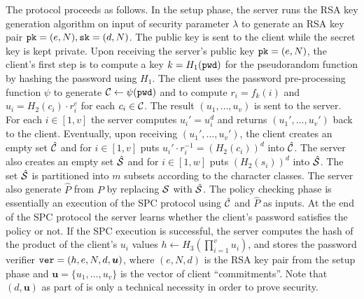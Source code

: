 The protocol proceeds as follows. 
In the setup phase, the server runs the RSA key generation algorithm on input of security parameter $\lambda$ to generate an RSA key pair $\mathtt{pk}=(e,N), \mathtt{sk}=(d,N)$. 
The public key is sent to the client while the secret key is kept private. 
Upon receiving the server's public key $\mathtt{pk}=(e,N)$, the client's first step is to compute a key $k=H_1(\mathtt{pwd})$ for the pseudorandom function by hashing the password using $H_1$. The client uses the password pre-processing function $\psi$ to generate $\mathcal{C}\gets\psi(\mathtt{pwd})$ and to compute $r_i=f_k(i)$ and $u_i=H_2(c_i)\cdot r_i^e$ for each $c_i\in\mathcal{C}$.
The result $(u_1,\ldots,u_v)$ is sent to the server.
For each $i\in[1,v]$ the server computes $u_i'=u_i^d$ and returns $(u_1',\ldots,u_v')$ back to the client. 
Eventually, upon receiving $(u_1',\ldots,u_v')$, the client creates an empty set $\hat{\mathcal{C}}$ and for $i\in[1,v]$ puts $u_i'\cdot r_i^{-1}=(H_2(c_i))^d$ into $\hat{\mathcal{C}}$. 
The server also creates an empty set $\hat{\mathcal{S}}$ and for $i\in[1,w]$ puts $(H_2(s_i))^d$ into $\hat{\mathcal{S}}$. The set $\hat{\mathcal{S}}$ is partitioned into $m$ subsets according to the character classes. The server also generate $\hat{P}$ from $P$ by replacing $\mathcal{S}$ with $\hat{\mathcal{S}}$.
The policy checking phase is essentially an execution of  the SPC protocol using $\hat{\mathcal{C}}$ and $\hat{P}$ as inputs. At the end of the SPC protocol the server learns whether the client's password satisfies the policy or not. If the SPC execution is successful, the server computes the hash of the product of the client's $u_i$ values $h\gets H_3(\prod_{i=1}^v u_i)$, and stores the password verifier $\mathtt{ver} = (h,e,N,d,\bm{u})$, where $(e,N,d)$ is the RSA key pair from the setup phase and $\bm{u}=\{u_1,\dots,u_v\}$ is the vector of client ``commitments''.
Note that $(d, \bm{u})$ as part of \ver is only a technical necessity in order to prove security.

